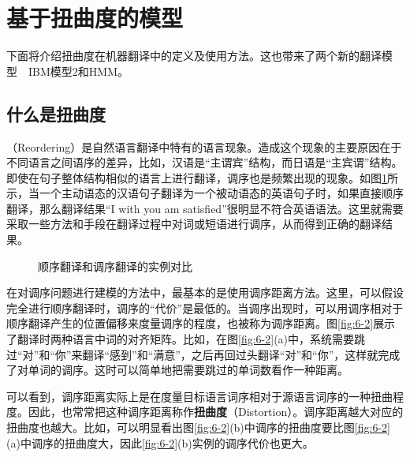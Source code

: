 \sectionnewpage
\section{基于扭曲度的模型}

下面将介绍扭曲度在机器翻译中的定义及使用方法。这也带来了两个新的翻译模型\ \dash\ IBM模型2和HMM。

\subsection{什么是扭曲度}

（Reordering）是自然语言翻译中特有的语言现象。造成这个现象的主要原因在于不同语言之间语序的差异，比如，汉语是“主谓宾”结构，而日语是“主宾谓”结构。即使在句子整体结构相似的语言上进行翻译，调序也是频繁出现的现象。如图\ref{fig:6-1}所示，当一个主动语态的汉语句子翻译为一个被动语态的英语句子时，如果直接顺序翻译，那么翻译结果“I with you am satisfied”很明显不符合英语语法。这里就需要采取一些方法和手段在翻译过程中对词或短语进行调序，从而得到正确的翻译结果。
\begin{figure}[htp]
    \centering

    \caption{顺序翻译和调序翻译的实例对比}
    \label{fig:6-1}
\end{figure}

\parinterval 在对调序问题进行建模的方法中，最基本的是使用调序距离方法。这里，可以假设完全进行顺序翻译时，调序的“代价”是最低的。当调序出现时，可以用调序相对于顺序翻译产生的位置偏移来度量调序的程度，也被称为调序距离。图\ref{fig:6-2}展示了翻译时两种语言中词的对齐矩阵。比如，在图\ref{fig:6-2}(a)中，系统需要跳过“对”和“你”来翻译“感到”和“满意”，之后再回过头翻译“对”和“你”，这样就完成了对单词的调序。这时可以简单地把需要跳过的单词数看作一种距离。

\parinterval 可以看到，调序距离实际上是在度量目标语言词序相对于源语言词序的一种扭曲程度。因此，也常常把这种调序距离称作{\small\sffamily\bfseries{扭曲度}}（Distortion）。调序距离越大对应的扭曲度也越大。比如，可以明显看出图\ref{fig:6-2}(b)中调序的扭曲度要比图\ref{fig:6-2}(a)中调序的扭曲度大，因此\ref{fig:6-2}(b)实例的调序代价也更大。

